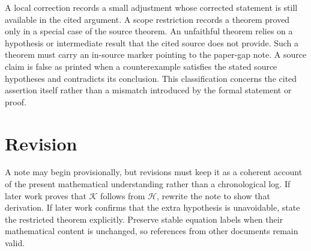 \documentclass{article}
\begin{document}
A local correction records a small adjustment whose corrected statement is
still available in the cited argument. A scope restriction records a theorem
proved only in a special case of the source theorem. An unfaithful theorem
relies on a hypothesis or intermediate result that the cited source does not
provide. Such a theorem must carry an in-source marker pointing to the
paper-gap note. A source claim is false as printed when a counterexample
satisfies the stated source hypotheses and contradicts its conclusion. This
classification concerns the cited assertion itself rather than a mismatch
introduced by the formal statement or proof.

\section{Revision}

A note may begin provisionally, but revisions must keep it as a coherent account
of the present mathematical understanding rather than a chronological log. If
later work proves that $\mathcal K$ follows from $\mathcal H$, rewrite the note
to show that derivation. If later work confirms that the extra hypothesis is
unavoidable, state the restricted theorem explicitly. Preserve stable equation
labels when their mathematical content is unchanged, so references from other
documents remain valid.



\end{document}
